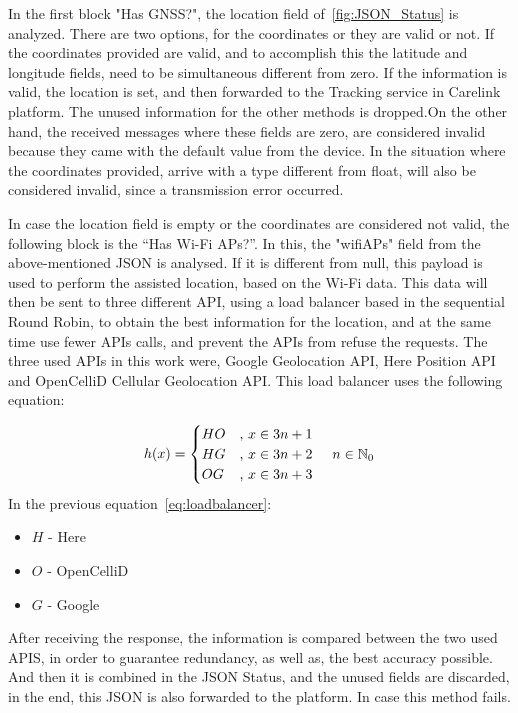 In the first block "Has GNSS?", the location field of~\ref{fig:JSON_Status} is analyzed. There are two options, for the coordinates or they are valid or not. If the coordinates provided are valid, and to accomplish this the latitude and longitude fields, need to be simultaneous different from zero. If the information is valid, the location is set, and then forwarded to the Tracking service in Carelink platform. The unused information for the other methods is dropped.\newline On the other hand, the received messages where these fields are zero, are considered invalid because they came with the default value from the device. In the situation where the coordinates provided, arrive with a type different from float, will also be considered invalid, since a transmission error occurred.


\newpage

In case the location field is empty or the coordinates are considered not valid, the following block is the “Has Wi-Fi APs?”. In this, the "wifiAPs"  field from the above-mentioned JSON is analysed. If it is different from null, this payload is used to perform the assisted location, based on the Wi-Fi data. This data will then be sent to three different API,  using a load balancer based in the sequential Round Robin, to obtain the best information for the location, and at the same time use fewer APIs calls, and prevent the APIs from refuse the requests. The three used APIs in this work were, Google Geolocation API, Here Position API and OpenCelliD Cellular Geolocation API. This load balancer uses the following equation:

\begin{equation} \label{eq:loadbalancer}
    h(x) = \begin{cases}
        HO & \text{, }x \in {3n+1}\\
        HG & \text{, }x \in {3n+2}
        \hspace{5mm} n \in \mathbb{N}_{0} \\
        OG & \text{, }x \in {3n+3}
        \end{cases} 
\end{equation}
In the previous equation~\ref{eq:loadbalancer}:
\begin{itemize}
	\item {$H$} - Here 
	\item {$O$} - OpenCelliD
	\item {$G$} - Google

\end{itemize} 
After receiving the response, the information is compared between the two used APIS, in order to guarantee redundancy, as well as, the best accuracy possible. And then it is combined in the JSON Status, and the unused fields are discarded, in the end, this JSON is also forwarded to the platform. In case this method fails.


